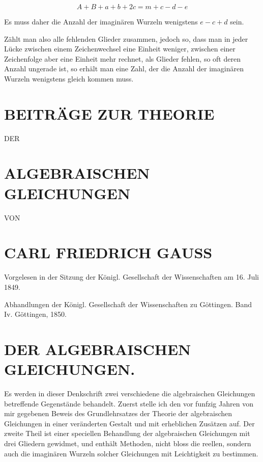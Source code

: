\documentclass[10pt]{article}
\begin{document}
\[
A+B+a+b+2 c=m+c-d-e
\]

Es muss daher die Anzahl der imaginären Wurzeln wenigstens \(e-c+d\) sein.

Zählt man also alle fehlenden Glieder zusammen, jedoch so, dass man in jeder Lücke zwischen einem Zeichenwechsel eine Einheit weniger, zwischen einer Zeichenfolge aber eine Einheit mehr rechnet, als Glieder fehlen, so oft deren Anzahl ungerade ist, so erhält man eine Zahl, der die Anzahl der imaginären Wurzeln wenigstens gleich kommen muss.

\section*{BEITRÄGE ZUR THEORIE}
DER

\section*{ALGEBRAISCHEN GLEICHUNGEN}
VON

\section*{CARL FRIEDRICH GAUSS}
Vorgelesen in der Sitzung der Königl. Gesellschaft der Wissenschaften am 16. Juli 1849.

Abhandlungen der Königl. Gesellschaft der Wissenschaften zu Göttingen. Band Iv. Göttingen, 1850.

\section*{DER ALGEBRAISCHEN GLEICHUNGEN.}
Es werden in dieser Denkschrift zwei verschiedene die algebraischen Gleichungen betreffende Gegenstände behandelt. Zuerst stelle ich den vor funfzig Jahren von mir gegebenen Beweis des Grundlehrsatzes der Theorie der algebraischen Gleichungen in einer veränderten Gestalt und mit erheblichen Zusätzen auf. Der zweite Theil ist einer speciellen Behandlung der algebraischen Gleichungen mit drei Gliedern gewidmet, und enthält Methoden, nicht bloss die reellen, sondern auch die imaginären Wurzeln solcher Gleichungen mit Leichtigkeit zu bestimmen.
\end{document}
